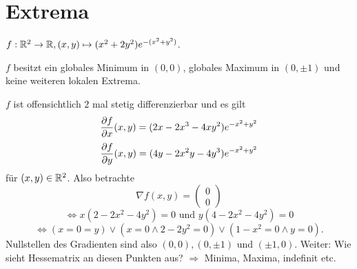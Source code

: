 \documentclass[../ana2u.tex]{subfiles}
\begin{document}
\setcounter{section}{10}
\section{Extrema}
\( f:\mathbb{R}^2\rightarrow \mathbb{R}, (x,y) \mapsto (x^2 + 2y^2) e^{-(x^2 + y^2)} \).

\begin{beh}
    \(f\) besitzt ein globales Minimum in \((0,0)\), globales Maximum in
    \((0, \pm 1)\) und keine weiteren lokalen Extrema.
\end{beh}
\begin{bew}
    \(f\) ist offensichtlich \( 2 \) mal stetig differenzierbar und 
    es gilt 
    \[ \frac{\partial f}{\partial x} (x,y) = (2x - 2x^3 - 4xy^2)e^{-x^2 + y^2} \]
    \[ \frac{\partial f}{\partial y} (x,y) = (4y - 2x^2y - 4y^3)e^{-x^2 + y^2} \]
    für \( (x,y) \in \mathbb{R}^2 \).
    Also betrachte 
    \[ \nabla f(x,y) = \begin{pmatrix} 0 \\ 0\end{pmatrix} \]
    \[ \Leftrightarrow x(2 - 2x^2 - 4y^2) = 0 \text{ und }
    y(4 - 2x^2 - 4y^2) = 0 \]
    \[ \Leftrightarrow (x = 0 = y) \vee (x = 0 \wedge 2 - 2y^2 = 0)
    \vee (1 - x^2 = 0 \wedge y = 0). \]
    Nullstellen des Gradienten sind also \( (0,0), (0, \pm 1) \) 
    und \( (\pm 1, 0) \). 
    Weiter: Wie sieht Hessematrix an diesen Punkten aus?
    \( \Rightarrow \) Minima, Maxima, indefinit etc.
\end{bew}
\end{document}

